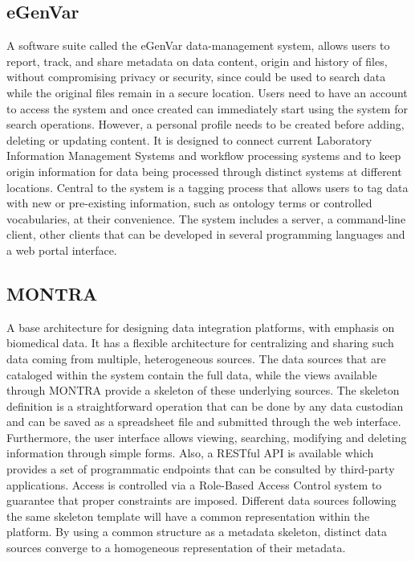 \subsection*{eGenVar}

A software suite called the eGenVar\cite{egenvar} data-management system, allows users to report,
track, and share metadata on data content, origin and history of files, without
compromising privacy or security, since could be used to search data while the original
files remain in a secure location.
Users need to have an account to access the system and once created can immediately
start using the system for search operations.
However, a personal profile needs to be created before adding, deleting or updating
content.
It is designed to connect current Laboratory Information Management Systems and
workflow processing systems and to keep origin information for data being processed
through distinct systems at different locations.
Central to the system is a tagging process that allows users to tag data with new or
pre-existing information, such as ontology terms or controlled vocabularies, at their
convenience.
The system includes a server, a command-line client, other clients that can be
developed in several programming languages and a web portal interface.


\subsection*{MONTRA}
A base architecture for designing data integration platforms, with emphasis on
biomedical data.
It has a flexible architecture for centralizing and sharing such data coming from
multiple, heterogeneous sources.
The data sources that are cataloged within the system contain the full data, while the
views available through MONTRA\cite{montra} provide a skeleton of these underlying sources.
The skeleton definition is a straightforward operation that can be done by any data
custodian and can be saved as a spreadsheet file and submitted through the web
interface.
Furthermore, the user interface allows viewing, searching, modifying and deleting
information through simple forms.
Also, a RESTful API is available which provides a set of programmatic endpoints that
can be consulted by third-party applications.
Access is controlled via a Role-Based Access Control system to guarantee that proper
constraints are imposed.
Different data sources following the same skeleton template will have a common
representation within the platform.
By using a common structure as a metadata skeleton, distinct data sources converge to a
homogeneous representation of their metadata.

